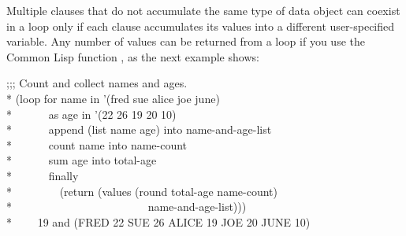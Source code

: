 Multiple clauses that do not accumulate the same type of data object 
can coexist in a loop only if each clause accumulates its values into 
a different user-specified variable.  Any number of values can
be returned from a loop if you use the Common Lisp function ,
as the next example shows:
\begin{lisp}
;;; Count and collect names and ages. \\*
(loop for name in '(fred sue alice joe june) \\*
~~~~~~as age in '(22 26 19 20 10) \\*
~~~~~~append (list name age) into name-and-age-list \\*
~~~~~~count name into name-count \\*
~~~~~~sum age into total-age \\*
~~~~~~finally \\*
~~~~~~~~(return (values (round total-age name-count) \\*
~~~~~~~~~~~~~~~~~~~~~~~~name-and-age-list))) \\*
~~~\EV~19 {\rm and} (FRED 22 SUE 26 ALICE 19 JOE 20 JUNE 10)
\end{lisp}

